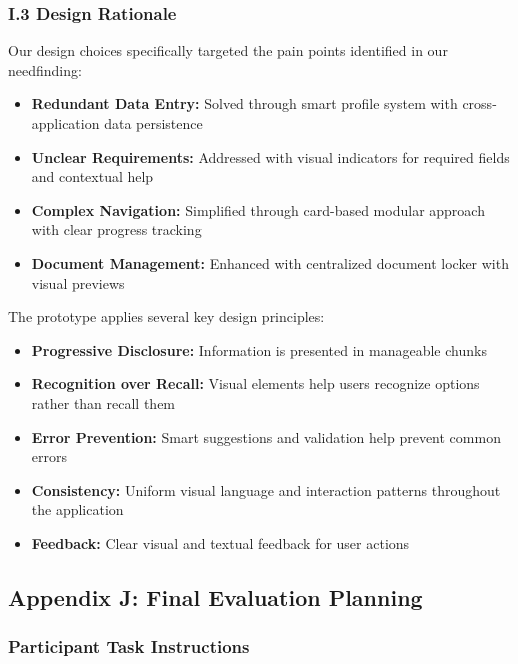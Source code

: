 \documentclass[
	letterpaper, %
]{jdf}
\begin{document}
\begin{sloppypar}
\subsubsection*{I.3 Design Rationale}

Our design choices specifically targeted the pain points identified in our needfinding:

\begin{itemize}
    \item \textbf{Redundant Data Entry:} Solved through smart profile system with cross-application data persistence
    \item \textbf{Unclear Requirements:} Addressed with visual indicators for required fields and contextual help
    \item \textbf{Complex Navigation:} Simplified through card-based modular approach with clear progress tracking
    \item \textbf{Document Management:} Enhanced with centralized document locker with visual previews
\end{itemize}

The prototype applies several key design principles:

\begin{itemize}
    \item \textbf{Progressive Disclosure:} Information is presented in manageable chunks
    \item \textbf{Recognition over Recall:} Visual elements help users recognize options rather than recall them
    \item \textbf{Error Prevention:} Smart suggestions and validation help prevent common errors
    \item \textbf{Consistency:} Uniform visual language and interaction patterns throughout the application
    \item \textbf{Feedback:} Clear visual and textual feedback for user actions
\end{itemize}

\newpage


\subsection{Appendix J: Final Evaluation Planning}

\subsubsection{ Participant Task Instructions}


\end{sloppypar}
\end{document}
